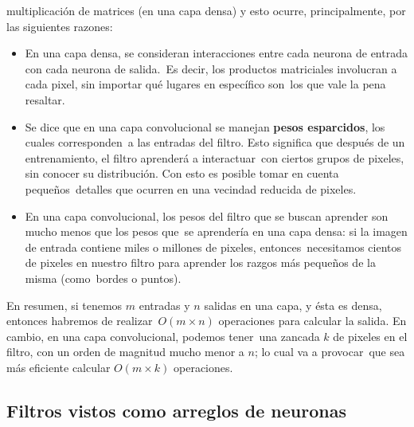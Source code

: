 multiplicación de matrices (en una capa densa) y esto ocurre, principalmente, por las siguientes razones:
\begin{itemize}
\item En una capa densa, se consideran interacciones entre cada neurona de entrada con cada neurona de salida.\
  Es decir, los productos matriciales involucran a cada pixel, sin importar qué lugares en específico son\
  los que vale la pena resaltar.
\item Se dice que en una capa convolucional se manejan \textbf{pesos esparcidos}, los cuales corresponden\
  a las entradas del filtro. Esto significa que después de un entrenamiento, el filtro aprenderá a interactuar\
  con ciertos grupos de pixeles, sin conocer su distribución. Con esto es posible tomar en cuenta pequeños\
  detalles que ocurren en una vecindad reducida de pixeles.
\item En una capa convolucional, los pesos del filtro que se buscan aprender son mucho menos que los pesos que\
  se aprendería en una capa densa: si la imagen de entrada contiene miles o millones de pixeles, entonces\
  necesitamos cientos de pixeles en nuestro filtro para aprender los razgos más pequeños de la misma (como\
  bordes o puntos).
\end{itemize}\par
En resumen, si tenemos $m$ entradas y $n$ salidas en una capa, y ésta es densa, entonces habremos de realizar\
$O(m \times n)$ operaciones para calcular la salida. En cambio, en una capa convolucional, podemos tener\
una zancada $k$ de pixeles en el filtro, con un orden de magnitud mucho menor a $n$; lo cual va a provocar\
que sea más eficiente calcular $O(m \times k)$ operaciones.

\subsection{Filtros vistos como arreglos de neuronas}


